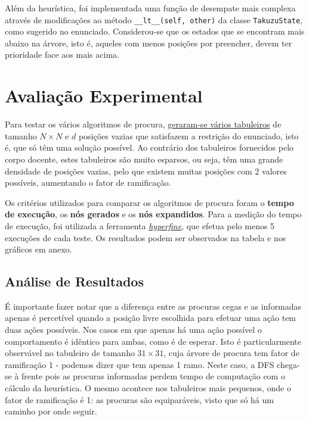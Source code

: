 \documentclass[12pt,a4paper]{article}
\begin{document}
Além da heurística, foi implementada uma função de desempate mais complexa através de
modificações ao método \texttt{\_\_lt\_\_(self, other)} da classe \texttt{TakuzuState}, como sugerido no enunciado.
Considerou-se que os estados que se encontram mais abaixo na árvore, isto é, aqueles com
menos posições por preencher, devem ter prioridade face aos mais acima.

\section{Avaliação Experimental}

Para testar os vários algoritmos de procura,
\href{https://gist.github.com/D-Card/68d32c6371abfce61dc5bbaabd633f27}{geraram-se vários tabuleiros} de tamanho \(N \times N\)
e \(d\) posições vazias que satisfazem a restrição do enunciado, isto é, que só têm uma solução possível.
Ao contrário dos tabuleiros fornecidos pelo corpo docente, estes tabuleiros são muito
esparsos, ou seja, têm uma grande densidade de posições vazias, pelo que existem muitas
posições com 2 valores possíveis, aumentando o fator de ramificação.

Os critérios utilizados para comparar os algoritmos de procura foram o \textbf{tempo de execução},
os \textbf{nós gerados} e os \textbf{nós expandidos}.
Para a medição do tempo de execução, foi utilizada a ferramenta \href{https://github.com/sharkdp/hyperfine}{\textit{hyperfine}},
que efetua pelo menos 5 execuções de cada teste.
Os resultados podem ser observados na tabela e nos gráficos em anexo.

\subsection{Análise de Resultados}

É importante fazer notar que a diferença entre as procuras cegas e as informadas
apenas é percetível quando a posição livre escolhida para efetuar uma ação tem duas ações possíveis.
Nos casos em que apenas há uma ação possível o comportamento é idêntico para ambas, como é de esperar.
Isto é particularmente observável no tabuleiro de tamanho \(31 \times 31\), cuja árvore de procura tem fator de ramificação 1 -
podemos dizer que tem apenas 1 ramo. Neste caso, a DFS chega-se à frente pois as procuras informadas perdem
tempo de computação com o cálculo da heurística.
O mesmo acontece nos tabuleiros mais pequenos, onde o fator de ramificação é 1:
as procuras são equiparáveis, visto que só há um caminho por onde seguir.
\end{document}
